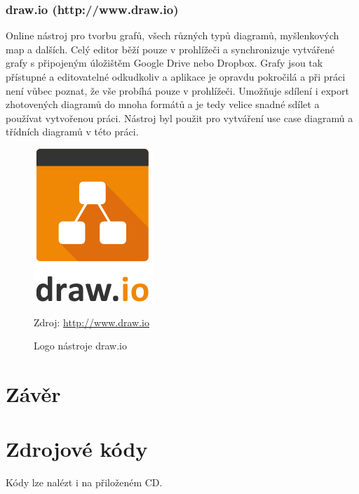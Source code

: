 \documentclass{article}
\begin{document}
\subsubsection{draw.io (http://www.draw.io)}
Online nástroj pro tvorbu grafů, všech různých typů diagramů, myšlenkových map a dalších.
Celý editor běží pouze v prohlížeči a synchronizuje vytvářené grafy s připojeným úložištěm
Google Drive nebo Dropbox. Grafy jsou tak přístupné  a editovatelné odkudkoliv a aplikace
je opravdu pokročilá a při práci není vůbec poznat, že vše probíhá pouze v prohlížeči.
Umožňuje sdílení i export zhotovených diagramů do mnoha formátů a je tedy velice snadné
sdílet a používat vytvořenou práci.
Nástroj byl použit pro vytváření use case diagramů a třídních diagramů v této práci.
\begin{figure}[H]
        \centering
                \includegraphics[scale=0.2]{img/drawiologo.png}
        \caption{Logo nástroje draw.io}
        \label{fig:iologo}
        \centering Zdroj: \url{http://www.draw.io}
\end{figure}




\section{Závěr}


\begin{thebibliography}{99}

\end{thebibliography}

  \appendix

  \section{Zdrojové kódy}
  Kódy lze nalézt i na přiloženém CD.
\end{document}
